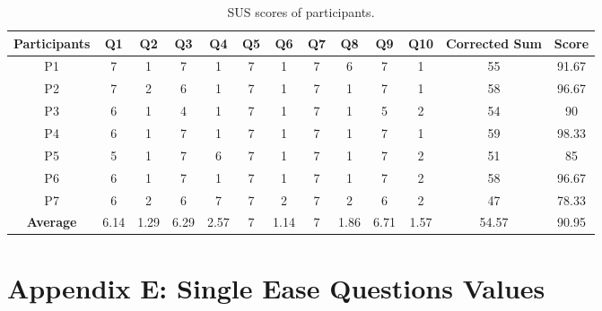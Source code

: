 \begin{table}
    \centering
    \caption*{SUS scores of participants.}\label{table:sus_scoring}
    \vspace{1em}
    \begin{tabular}{c c c c c c c c c c c c c}
        \hline
        \textbf{Participants} & \textbf{Q1} & \textbf{Q2} & \textbf{Q3} & \textbf{Q4} & \textbf{Q5} & \textbf{Q6} & \textbf{Q7} & \textbf{Q8} & \textbf{Q9} & \textbf{Q10} & \textbf{Corrected Sum} & \textbf{Score} \\
        \hline
        P1 & 7 & 1 & 7 & 1 & 7 & 1 & 7 & 6 & 7 & 1 & 55 & 91.67 \\
        \hline
        P2 & 7 & 2 & 6 & 1 & 7 & 1 & 7 & 1 & 7 & 1 & 58 & 96.67 \\
        \hline
        P3 & 6 & 1 & 4 & 1 & 7 & 1 & 7 & 1 & 5 & 2 & 54 & 90 \\
        \hline
        P4 & 6 & 1 & 7 & 1 & 7 & 1 & 7 & 1 & 7 & 1 & 59 & 98.33 \\
        \hline
        P5 & 5 & 1 & 7 & 6 & 7 & 1 & 7 & 1 & 7 & 2 & 51 & 85 \\
        \hline
        P6 & 6 & 1 & 7 & 1 & 7 & 1 & 7 & 1 & 7 & 2 & 58 & 96.67 \\
        \hline
        P7 & 6 & 2 & 6 & 7 & 7 & 2 & 7 & 2 & 6 & 2 & 47 & 78.33 \\
        \hline
        \textbf{Average} & 6.14 & 1.29 & 6.29 & 2.57 & 7 & 1.14 & 7 & 1.86 & 6.71 & 1.57 & 54.57 & 90.95 \\
        \hline
    \end{tabular}
\end{table}

\clearpage

\section*{Appendix E: Single Ease Questions Values}\label{appendix:seq}

